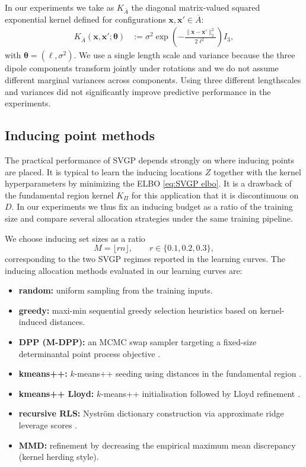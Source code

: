 \documentclass[11pt,a4paper]{article}
\newcommand{\bx}{\boldsymbol{x}}
\newcommand{\btheta}{\boldsymbol{\theta}}
\begin{document}
In our experiments we take as $K_{\bar A}$ the diagonal matrix-valued squared exponential kernel defined for configurations $\bx,\bx' \in \overline{A}:$
\begin{align}\label{eq:KAforNMF}
K_{\bar A}\left(\bx,\bx';\btheta\right)
&:= \sigma^2\exp\!\left(-\frac{\|\bx-\bx'\|_2^2}{2\ell^2}\right)I_3,
\end{align}
with $\btheta=(\ell,\sigma^2)$. We use a single length scale and variance because the three dipole components transform jointly under rotations and we do not assume different marginal variances across components. Using three different lengthscales and variances did not significantly improve predictive performance in the experiments. 

\subsection{Inducing point methods}
\label{subsec:inducing}
The practical performance of SVGP depends strongly on where inducing points are placed. It is typical to learn the inducing locations $Z$ together with the kernel hyperparameters by minimizing the ELBO \eqref{eq:SVGP elbo}. It is a drawback of the fundamental region kernel $K_\Pi$ for this application that it is discontinuous on $D.$ In our experiments we thus fix an inducing budget as a ratio of the training size and compare several allocation strategies under the same training pipeline.

We choose inducing set sizes as a ratio
\begin{displaymath}M=\lfloor rn\rfloor,\qquad r\in\{0.1,0.2,0.3\},\end{displaymath}
corresponding to the two SVGP regimes reported in the learning curves. The inducing allocation methods evaluated in our learning curves are:
\begin{itemize}
\item \textbf{random:} uniform sampling from the training inputs.
\item \textbf{greedy:} maxi-min sequential greedy selection heuristics based on kernel-induced distances.
\item \textbf{DPP (M-DPP):} an MCMC swap sampler targeting a fixed-size determinantal point process objective \citep{Li2016FastDS}.
\item \textbf{kmeans++:} $k$-means++ seeding using distances in the fundamental region \cite{inproceedings}.
\item \textbf{kmeans++ Lloyd:} $k$-means++ initialisation followed by Lloyd refinement \cite{bachem16fast}.
\item \textbf{recursive RLS:} Nyström dictionary construction via approximate ridge leverage scores \citep{NIPS2017_a03fa308}.
\item \textbf{MMD:} refinement by decreasing the empirical maximum mean discrepancy (kernel herding style).
\end{itemize}
\end{document}
